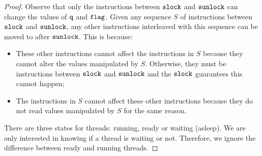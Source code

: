 \documentclass{article}[10pt]
\begin{document}
%
\begin{proof}
  Observe that only the instructions between $\text{\ttfamily slock}$ and $\text{\ttfamily sunlock}$
  can change the values of $\text{\ttfamily q}$ and $\text{\ttfamily flag}$. Given any sequence $S$
  of instructions between $\text{\ttfamily slock}$ and $\text{\ttfamily sunlock}$, any other
  instructions interleaved with this sequence can be moved to after
  $\text{\ttfamily sunlock}$. This is because:
  \begin{itemize}
  \item These other instructions cannot affect the instructions in $S$
    because they cannot alter the values manipulated by
    $S$. Otherwise, they must be instructions between $\text{\ttfamily slock}$ and
    $\text{\ttfamily sunlock}$ and the $\text{\ttfamily slock}$ guarantees this cannot happen;
  \item The instructions in $S$ cannot affect these other instructions
    because they do not read values manipulated by $S$ for the same
    reason.
  \end{itemize}

  There are three states for threads: running, ready or waiting
  (asleep). We are only interested in knowing if a thread is waiting
  or not. Therefore, we ignore the difference between ready and
  running threads.


\end{proof}
\end{document}
